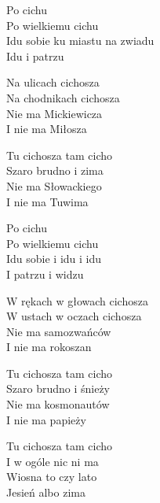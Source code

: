 \begin{text}
    Po cichu\\
    Po wielkiemu cichu\\
    Idu sobie ku miastu na zwiadu\\
    Idu i patrzu

    Na ulicach cichosza\\
    Na chodnikach cichosza\\
    Nie ma Mickiewicza\\
    I nie ma Miłosza

    Tu cichosza tam cicho\\
    Szaro brudno i zima\\
    Nie ma Słowackiego\\
    I nie ma Tuwima

    Po cichu\\
    Po wielkiemu cichu\\
    Idu sobie i idu i idu\\
    I patrzu i widzu

    W rękach w głowach cichosza\\
    W ustach w oczach cichosza\\
    Nie ma samozwańców\\
    I nie ma rokoszan

    Tu cichosza tam cicho\\
    Szaro brudno i śnieży\\
    Nie ma kosmonautów\\
    I nie ma papieży

    Tu cichosza tam cicho\\
    I w ogóle nic ni ma\\
    Wiosna to czy lato\\
    Jesień albo zima
\end{text}
\begin{chord}

\end{chord}